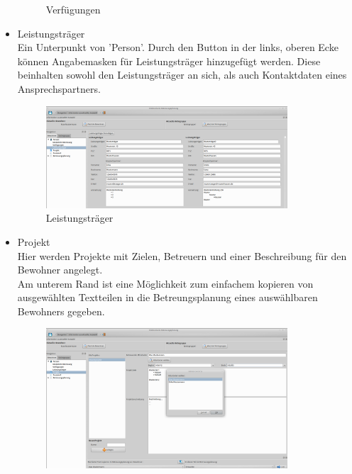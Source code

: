 \begin{itemize}
\begin{figure}[h!]
\begin{center}
			\caption{Verfügungen}
		\end{center}
	\end{figure}
	\FloatBarrier
	\item Leistungsträger\mbox{}\\
	\noindent
	Ein Unterpunkt von 'Person'. Durch den Button in der links, oberen Ecke können Angabemasken für Leistungsträger hinzugefügt werden. Diese beinhalten sowohl den Leistungsträger an sich, als auch Kontaktdaten eines Ansprechspartners.
	\begin{figure}[h!]
		\begin{center}
			\includegraphics[keepaspectratio=true, width=0.85\textwidth]{pics/client_leistungstraeger.png}
			\caption{Leistungsträger}
		\end{center}
	\end{figure}
	\FloatBarrier
	\newpage
	\item Projekt\mbox{}\\
	\noindent
	Hier werden Projekte mit Zielen, Betreuern und einer Beschreibung für den Bewohner angelegt.\\Am unterem Rand ist eine Möglichkeit zum einfachem kopieren von ausgewählten Textteilen in die Betreungsplanung eines auswählbaren Bewohners gegeben.
	\begin{figure}[h!]
		\begin{center}
			\includegraphics[keepaspectratio=true, width=0.85\textwidth]{pics/client_projekt.png}

\end{center}
\end{figure}
\end{itemize}
